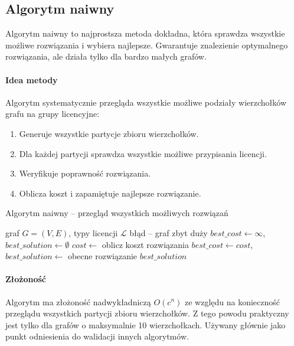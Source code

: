 \subsection{Algorytm naiwny}

Algorytm naiwny to najprostsza metoda dokładna, która sprawdza wszystkie możliwe rozwiązania i wybiera najlepsze. Gwarantuje znalezienie optymalnego rozwiązania, ale działa tylko dla bardzo małych grafów.

\paragraph{Idea metody}
Algorytm systematycznie przegląda wszystkie możliwe podziały wierzchołków grafu na grupy licencyjne:
\begin{enumerate}
  \item Generuje wszystkie partycje zbioru wierzchołków.
  \item Dla każdej partycji sprawdza wszystkie możliwe przypisania licencji.
  \item Weryfikuje poprawność rozwiązania.
  \item Oblicza koszt i zapamiętuje najlepsze rozwiązanie.
\end{enumerate}

\begin{algorithm}[H]
\caption{Algorytm naiwny -- przegląd wszystkich możliwych rozwiązań}
\label{alg:naive}
\begin{algorithmic}[1]
\Require graf $G=(V,E)$, typy licencji $\mathcal{L}$
 \State \Return błąd -- graf zbyt duży \EndIf
\State $best\_cost \gets \infty$, $best\_solution \gets \emptyset$
      \State $cost \gets$ oblicz koszt rozwiązania
        \State $best\_cost \gets cost$, $best\_solution \gets$ obecne rozwiązanie
      \EndIf
    \EndIf
  \EndFor
\EndFor
\State \Return $best\_solution$
\end{algorithmic}
\end{algorithm}

\paragraph{Złożoność}
Algorytm ma złożoność nadwykładniczą $O(c^n)$ ze względu na konieczność przeglądu wszystkich partycji zbioru wierzchołków. Z tego powodu praktyczny jest tylko dla grafów o maksymalnie 10 wierzchołkach. Używany głównie jako punkt odniesienia do walidacji innych algorytmów.


